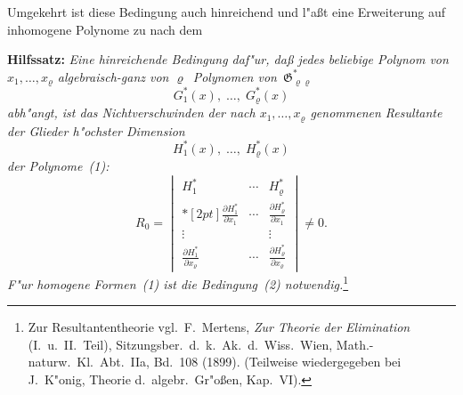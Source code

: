 \documentclass[11pt,a4paper]{article}
\begin{document}
Umgekehrt ist diese Bedingung auch hinreichend und l"{a}\ss{}t eine
Erweiterung auf inhomogene Polynome zu nach dem

\medskip
\noindent
\textbf{Hilfssatz:} \emph{Eine hinreichende Bedingung daf"{u}r, da\ss{} jedes
beliebige Polynom von $x_{1},\dots,x_{\varrho}$ algebraisch-ganz von $\varrho$~Polynomen
von~$\mathfrak{G}_{\varrho\varrho}^{*}$}
\begin{equation}
G_{1}^{*}(x),\;\dots,\;G_{\varrho}^{*}(x)
\tag{1}
\end{equation}
\emph{abh"{a}ngt, ist das Nichtverschwinden der nach $x_{1},\dots,x_{\varrho}$ genommenen
Resultante der Glieder h"{o}chster Dimension}
\begin{equation}
H_{1}^{*}(x),\;\dots,\;H_{\varrho}^{*}(x)
\tag{2}
\end{equation}
\emph{der Polynome~(1):}
\[R_{0}=\begin{vmatrix} H_{1}^{*} & \cdots & H_{\varrho}^{*} \\*[2pt]
\frac{\partial H_{1}^{*}}{\partial x_{1}} & \cdots & \frac{\partial H_{\varrho}^{*}}{\partial x_{1}} \\
\vdots & & \vdots \\
\frac{\partial H_{1}^{*}}{\partial x_{\varrho}} & \cdots & \frac{\partial H_{\varrho}^{*}}{\partial x_{\varrho}}
\end{vmatrix}\neq 0.\]
\emph{F"{u}r homogene Formen~(1) ist die Bedingung~(2) notwendig.}\footnote{Zur
Resultantentheorie vgl.\ F.~Mertens, \emph{Zur Theorie der Elimination} (I.\ u.\ II.\ Teil),
Sitzungsber.\ d.\ k.\ Ak.\ d.\ Wiss.\ Wien, Math.-naturw.\ Kl.\ Abt.\ IIa, Bd.\ 108
(1899). (Teilweise wiedergegeben bei J.\ K"{o}nig, Theorie d.\ algebr.\ Gr"{o}\ss{}en,
Kap.\ VI).}
\end{document}
